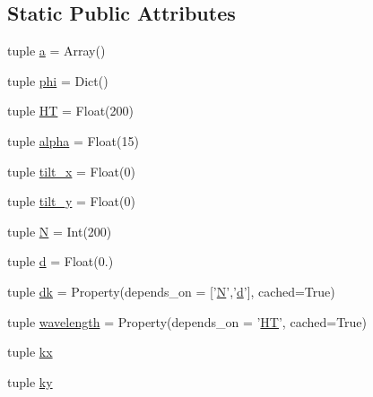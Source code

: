 \subsection*{Static Public Attributes}
\begin{DoxyCompactItemize}
\item 
tuple \hyperlink{classpython_1_1models_1_1raw__models_1_1probe_1_1probe_a5ae738610713a3594cb579713ba73035}{a} = Array()
\item 
tuple \hyperlink{classpython_1_1models_1_1raw__models_1_1probe_1_1probe_aee37a5da5c849a3a242783da0cbe09f1}{phi} = Dict()
\item 
tuple \hyperlink{classpython_1_1models_1_1raw__models_1_1probe_1_1probe_a60c26931675d548d6d7886178df71655}{H\-T} = Float(200)
\item 
tuple \hyperlink{classpython_1_1models_1_1raw__models_1_1probe_1_1probe_a9bc42e657ff2b2b5e256d69d42257f4a}{alpha} = Float(15)
\item 
tuple \hyperlink{classpython_1_1models_1_1raw__models_1_1probe_1_1probe_a0f1b68b57f10016771e973c37cd743ef}{tilt\-\_\-x} = Float(0)
\item 
tuple \hyperlink{classpython_1_1models_1_1raw__models_1_1probe_1_1probe_a0b69db4cc0341378a8f86aff6e7012d5}{tilt\-\_\-y} = Float(0)
\item 
tuple \hyperlink{classpython_1_1models_1_1raw__models_1_1probe_1_1probe_a79a4816dc01b9dec64a69f61c3bb3378}{N} = Int(200)
\item 
tuple \hyperlink{classpython_1_1models_1_1raw__models_1_1probe_1_1probe_ad0a0cc768c75ec81f9afec0cd3572bc3}{d} = Float(0.)
\item 
tuple \hyperlink{classpython_1_1models_1_1raw__models_1_1probe_1_1probe_a58c9fb8a7bbec972b51f5839d815f793}{dk} = Property(depends\-\_\-on = \mbox{[}'\hyperlink{classpython_1_1models_1_1raw__models_1_1probe_1_1probe_a79a4816dc01b9dec64a69f61c3bb3378}{N}','\hyperlink{classpython_1_1models_1_1raw__models_1_1probe_1_1probe_ad0a0cc768c75ec81f9afec0cd3572bc3}{d}'\mbox{]}, cached=True)
\item 
tuple \hyperlink{classpython_1_1models_1_1raw__models_1_1probe_1_1probe_a3a05cfce65087be2c959df7b60d07905}{wavelength} = Property(depends\-\_\-on = '\hyperlink{classpython_1_1models_1_1raw__models_1_1probe_1_1probe_a60c26931675d548d6d7886178df71655}{H\-T}', cached=True)
\item 
tuple \hyperlink{classpython_1_1models_1_1raw__models_1_1probe_1_1probe_a2df0b681e6bf2f7ac215f9d0174de2ea}{kx}
\item 
tuple \hyperlink{classpython_1_1models_1_1raw__models_1_1probe_1_1probe_aa4267b1a4f563355ed7a424d4c0e8995}{ky}

\end{DoxyCompactItemize}
